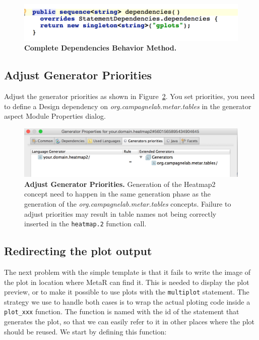\begin{figure}
  \centering
  \includegraphics[width=\figWidthSmall]{figures/dependenciesMethodComplete.png}
\caption[Complete Dependencies Behavior Method.]{\textbf{Complete Dependencies Behavior Method.}}
\label{fig:dependenciesMethodComplete}
\end{figure}

\subsection{Adjust Generator Priorities}
Adjust the generator priorities as shown in Figure~\ref{fig:Generator_Properties_your_domain_heatmap2}. You set priorities, you need to define a Design dependency on \textit{org.campagnelab.metar.tables} in the generator aspect Module Properties dialog. 

\begin{figure}[h!tbp]
  \centering
  \includegraphics[width=\figWidthWide]{figures/Generator_Properties_your_domain_heatmap2.png}
\caption[Adjust Generator Priorities.]{\textbf{Adjust Generator Priorities.} Generation of the Heatmap2 concept need to happen in the same generation phase as the generation of the  \textit{org.campagnelab.metar.tables} concepts. Failure to adjust priorities may result in table names not being correctly inserted in the \texttt{heatmap.2} function call.}
\label{fig:Generator_Properties_your_domain_heatmap2}
\end{figure}

\subsection{Redirecting the plot output}
The next problem with the simple template is that it fails to write the image of the plot in  location where MetaR can find it. This is needed to display the plot preview, or to make it possible to use plots with the \texttt{multiplot} statement.
The strategy we use to handle both cases is to wrap the actual ploting code inside a \texttt{plot\_xxx} function. The function is named with the id of the statement that generates the plot, so that we can easily refer to it in other places where the plot should be reused. We start by defining this function:

